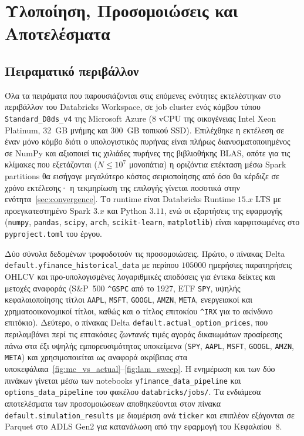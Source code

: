 \documentclass[12pt]{article}
\begin{document}
\newpage

\section{Υλοποίηση, Προσομοιώσεις και Αποτελέσματα}
\subsection{Πειραματικό περιβάλλον}

Όλα τα πειράματα που παρουσιάζονται στις επόμενες ενότητες εκτελέστηκαν στο περιβάλλον του Databricks Workspace, σε job cluster ενός κόμβου τύπου \texttt{Standard\_D8ds\_v4} της Microsoft Azure (8 vCPU της οικογένειας Intel Xeon Platinum, 32~GB μνήμης και $300$~GB τοπικού SSD). Επιλέχθηκε η εκτέλεση σε έναν μόνο κόμβο διότι ο υπολογιστικός πυρήνας είναι πλήρως διανυσματοποιημένος σε NumPy και αξιοποιεί τις χιλιάδες πυρήνες της βιβλιοθήκης BLAS, οπότε για τις κλίμακες που εξετάζονται ($N \leq 10^7$ μονοπάτια) η οριζόντια επέκταση μέσω Spark partitions θα εισήγαγε μεγαλύτερο κόστος σειριοποίησης από όσο θα κέρδιζε σε χρόνο εκτέλεσης· η τεκμηρίωση της επιλογής γίνεται ποσοτικά στην ενότητα~\ref{sec:convergence}. Το runtime είναι Databricks Runtime $15$.$x$ LTS με προεγκατεστημένο Spark $3$.$x$ και Python $3$.$11$, ενώ οι εξαρτήσεις της εφαρμογής (\texttt{numpy}, \texttt{pandas}, \texttt{scipy}, \texttt{arch}, \texttt{scikit-learn}, \texttt{matplotlib}) είναι καρφιτσωμένες στο \texttt{pyproject.toml} του έργου.

Δύο σύνολα δεδομένων τροφοδοτούν τις προσομοιώσεις. Πρώτο, ο πίνακας Delta \texttt{default.yfinance\_historical\_data} με περίπου $105000$ ημερήσιες παρατηρήσεις OHLCV και προ-υπολογισμένες λογαριθμικές αποδόσεις για έντεκα δείκτες και μετοχές αναφοράς (S\&P~500 \texttt{\^{}GSPC} από το 1927, ETF \texttt{SPY}, υψηλής κεφαλαιοποίησης τίτλοι \texttt{AAPL}, \texttt{MSFT}, \texttt{GOOGL}, \texttt{AMZN}, \texttt{META}, ενεργειακοί και χρηματοοικονομικοί τίτλοι, καθώς και ο τίτλος επιτοκίου \texttt{\^{}IRX} για το ακίνδυνο επιτόκιο). Δεύτερο, ο πίνακας Delta \texttt{default.actual\_option\_prices}, που περιλαμβάνει περί τις επτακόσιες \emph{ζωντανές} τιμές αγοράς δικαιωμάτων προαίρεσης πάνω στα έξι υψηλής εμπορευσιμότητας υποκείμενα (\texttt{SPY}, \texttt{AAPL}, \texttt{MSFT}, \texttt{GOOGL}, \texttt{AMZN}, \texttt{META}) και χρησιμοποιείται ως αναφορά ακρίβειας στα υποκεφάλαια~\ref{fig:mc_vs_actual}--\ref{fig:lam_sweep}. Η ενημέρωση και των δύο πινάκων γίνεται μέσω των notebooks \texttt{yfinance\_data\_pipeline} και \texttt{options\_data\_pipeline} του φακέλου \texttt{databricks/jobs/}. Τα ενδιάμεσα αποτελέσματα των προσομοιώσεων αποθηκεύονται στον πίνακα \texttt{default.simulation\_results} με διαμέριση ανά \texttt{ticker} και επιπλέον εξάγονται σε Parquet στο ADLS Gen2 για κατανάλωση από την εφαρμογή του Κεφαλαίου~8.
\end{document}
